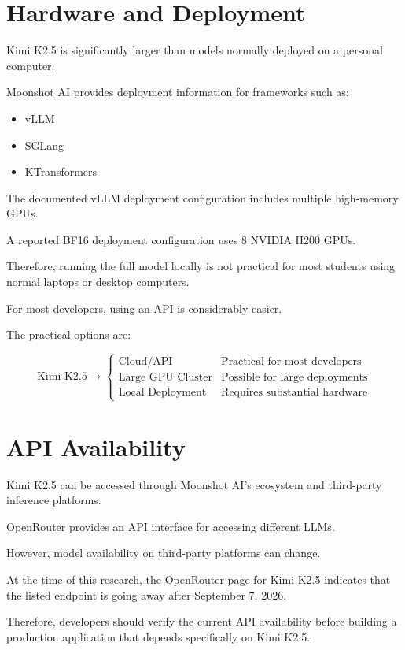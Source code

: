 \documentclass{article}
\begin{document}
\section{Hardware and Deployment}

Kimi K2.5 is significantly larger than models normally deployed on a personal computer.

Moonshot AI provides deployment information for frameworks such as:

\begin{itemize}
\item vLLM
\item SGLang
\item KTransformers
\end{itemize}

The documented vLLM deployment configuration includes multiple high-memory GPUs.

A reported BF16 deployment configuration uses 8 NVIDIA H200 GPUs.

Therefore, running the full model locally is not practical for most students using normal laptops or desktop computers.

For most developers, using an API is considerably easier.

The practical options are:

\[
\text{Kimi K2.5}
\rightarrow
\begin{cases}
\text{Cloud/API} & \text{Practical for most developers}\\
\text{Large GPU Cluster} & \text{Possible for large deployments}\\
\text{Local Deployment} & \text{Requires substantial hardware}
\end{cases}
\]

\section{API Availability}

Kimi K2.5 can be accessed through Moonshot AI's ecosystem and third-party inference platforms.

OpenRouter provides an API interface for accessing different LLMs.

However, model availability on third-party platforms can change.

At the time of this research, the OpenRouter page for Kimi K2.5 indicates that the listed endpoint is going away after September 7, 2026.

Therefore, developers should verify the current API availability before building a production application that depends specifically on Kimi K2.5.
\end{document}
